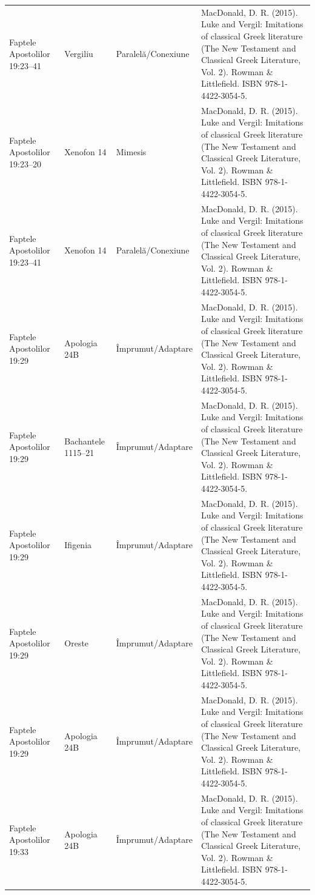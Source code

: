 \documentclass[12pt,a4paper,twoside,openany]{book}
\begin{document}
\begin{longtable}{L{1.4cm}L{1.7cm}L{3.1cm}L{8.4cm}}
Faptele Apostolilor 19:23–41 & Vergiliu & Paralelă/Conexiune & MacDonald, D. R. (2015). Luke and Vergil: Imitations of classical Greek literature (The New Testament and Classical Greek Literature, Vol. 2). Rowman \& Littlefield. ISBN 978-1-4422-3054-5. \\
Faptele Apostolilor 19:23–20 & Xenofon 14 & Mimesis & MacDonald, D. R. (2015). Luke and Vergil: Imitations of classical Greek literature (The New Testament and Classical Greek Literature, Vol. 2). Rowman \& Littlefield. ISBN 978-1-4422-3054-5. \\
Faptele Apostolilor 19:23–41 & Xenofon 14 & Paralelă/Conexiune & MacDonald, D. R. (2015). Luke and Vergil: Imitations of classical Greek literature (The New Testament and Classical Greek Literature, Vol. 2). Rowman \& Littlefield. ISBN 978-1-4422-3054-5. \\
Faptele Apostolilor 19:29 & Apologia 24B & Împrumut/Adaptare & MacDonald, D. R. (2015). Luke and Vergil: Imitations of classical Greek literature (The New Testament and Classical Greek Literature, Vol. 2). Rowman \& Littlefield. ISBN 978-1-4422-3054-5. \\
Faptele Apostolilor 19:29 & Bachantele 1115–21 & Împrumut/Adaptare & MacDonald, D. R. (2015). Luke and Vergil: Imitations of classical Greek literature (The New Testament and Classical Greek Literature, Vol. 2). Rowman \& Littlefield. ISBN 978-1-4422-3054-5. \\
Faptele Apostolilor 19:29 & Ifigenia & Împrumut/Adaptare & MacDonald, D. R. (2015). Luke and Vergil: Imitations of classical Greek literature (The New Testament and Classical Greek Literature, Vol. 2). Rowman \& Littlefield. ISBN 978-1-4422-3054-5. \\
Faptele Apostolilor 19:29 & Oreste & Împrumut/Adaptare & MacDonald, D. R. (2015). Luke and Vergil: Imitations of classical Greek literature (The New Testament and Classical Greek Literature, Vol. 2). Rowman \& Littlefield. ISBN 978-1-4422-3054-5. \\
Faptele Apostolilor 19:29 & Apologia 24B & Împrumut/Adaptare & MacDonald, D. R. (2015). Luke and Vergil: Imitations of classical Greek literature (The New Testament and Classical Greek Literature, Vol. 2). Rowman \& Littlefield. ISBN 978-1-4422-3054-5. \\
Faptele Apostolilor 19:33 & Apologia 24B & Împrumut/Adaptare & MacDonald, D. R. (2015). Luke and Vergil: Imitations of classical Greek literature (The New Testament and Classical Greek Literature, Vol. 2). Rowman \& Littlefield. ISBN 978-1-4422-3054-5. \\

\end{longtable}
\end{document}
